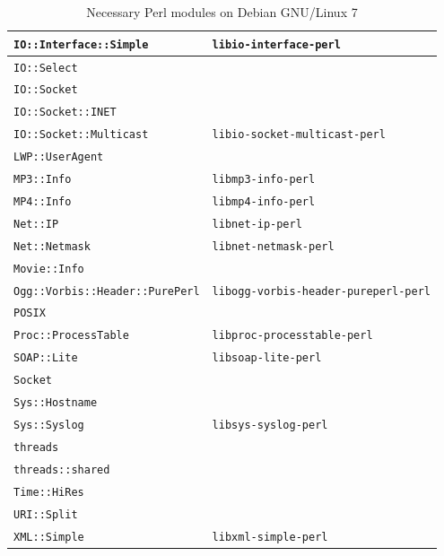 \documentclass[a4paper,oneside,10pt]{report}
\begin{document}
\begin{table}
\begin{tabular}{|p{15em}|p{18em}|}
		\hline
		\verb|IO::Interface::Simple| 					& \verb|libio-interface-perl| \\
		\hline
		\verb|IO::Select| 										& \\
		\hline
		\verb|IO::Socket| 										& \\
		\hline
		\verb|IO::Socket::INET| 							& \\
		\hline
		\verb|IO::Socket::Multicast| 					& \verb|libio-socket-multicast-perl| \\
		\hline
		\verb|LWP::UserAgent| 								& \\
		\hline
		\verb|MP3::Info| 											& \verb|libmp3-info-perl| \\
		\hline
		\verb|MP4::Info| 											& \verb|libmp4-info-perl| \\
		\hline
		\verb|Net::IP| 												& \verb|libnet-ip-perl| \\
		\hline
		\verb|Net::Netmask| 									& \verb|libnet-netmask-perl| \\
		\hline
		\verb|Movie::Info| 										& \\
		\hline
		\verb|Ogg::Vorbis::Header::PurePerl| 	& \verb|libogg-vorbis-header-pureperl-perl| \\
		\hline
		\verb|POSIX| 													& \\
		\hline
		\verb|Proc::ProcessTable| 						& \verb|libproc-processtable-perl| \\
		\hline
		\verb|SOAP::Lite| 										& \verb|libsoap-lite-perl| \\
		\hline
		\verb|Socket| 												& \\
		\hline
		\verb|Sys::Hostname| 									& \\
		\hline
		\verb|Sys::Syslog| 										& \verb|libsys-syslog-perl| \\
		\hline
		\verb|threads| 												& \\
		\hline
		\verb|threads::shared| 								& \\
		\hline
		\verb|Time::HiRes|										& \\
		\hline
		\verb|URI::Split| 										& \\
		\hline
		\verb|XML::Simple| 										& \verb|libxml-simple-perl| \\
		\hline
	\end{tabular}
	\caption{Necessary Perl modules on Debian GNU/Linux 7}
	\label{tab:NecessaryPerlModulesDebian7}
\end{table}
\end{document}

